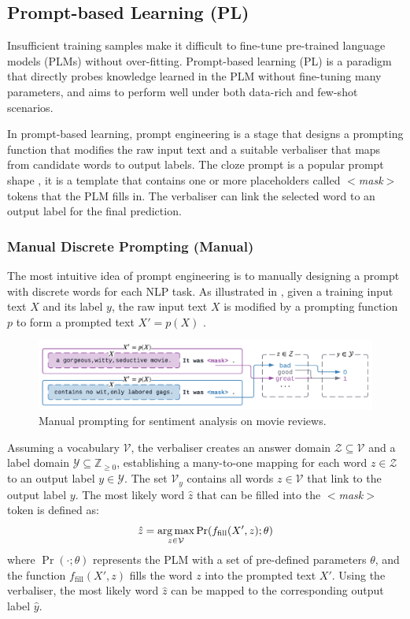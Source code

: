 \subsection{Prompt-based Learning (PL)}
Insufficient training samples make it difficult to fine-tune pre-trained language models (PLMs) without over-fitting. Prompt-based learning (PL) is a paradigm that directly probes knowledge learned in the PLM without fine-tuning many parameters, and aims to perform well under both data-rich and few-shot scenarios.

In prompt-based learning, prompt engineering is a stage that designs a prompting function that modifies the raw input text and a suitable verbaliser that maps from candidate words to output labels. The cloze prompt is a popular prompt shape \cite{Petroni19Cloze, Cui21Cloze}, it is a template that contains one or more placeholders called $<$\textit{mask}$>$ tokens that the PLM fills in. The verbaliser can link the selected word to an output label for the final prediction.

\subsubsection{Manual Discrete Prompting (Manual)}
The most intuitive idea of prompt engineering is to manually designing a prompt with discrete words for each NLP task. As illustrated in , given a training input text $X$ and its label $y$, the raw input text $X$ is modified by a prompting function $p$ to form a prompted text $X' = p(X)$ \cite{Liu21}. 

\begin{figure}[!ht]
    \centering
    \includegraphics[width=\hsize]{figures/preparation_media/prepare-manual.pdf}
    \caption{Manual prompting for sentiment analysis on movie reviews.}
    \label{fig:prepare-manual}
\end{figure}

Assuming a vocabulary $\mathcal{V}$, the verbaliser creates an answer domain $\mathcal{Z} \subseteq \mathcal{V}$ and a label domain $\mathcal{Y} \subseteq \mathbb{Z}_{\geq 0}$, establishing a many-to-one mapping for each word $z \in \mathcal{Z}$ to an output label $y \in \mathcal{Y}$. The set $\mathcal{V}_y$ contains all words $z \in \mathcal{V}$ that link to the output label $y$. The most likely word $\hat{z}$ that can be filled into the $<$\textit{mask}$>$ token is defined as: 
\begin{equation} 
\hat{z} = \operatorname*{arg\,max}_{z\in \mathcal{V}} \Pr(f_{\text{fill}}(X', z);\theta)
\end{equation}
where $\Pr(\cdot; \theta)$ represents the PLM with a set of pre-defined parameters $\theta$, and the function $f_{\text{fill}}(X', z)$ fills the word $z$ into the prompted text $X'$. Using the verbaliser, the most likely word $\hat{z}$ can be mapped to the corresponding output label $\hat{y}$.

